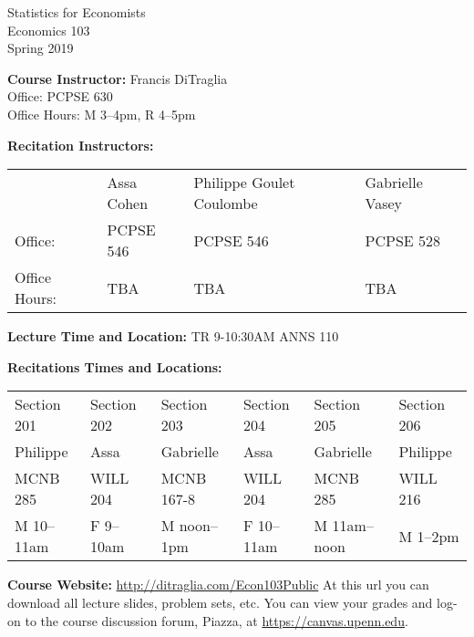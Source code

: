 \documentclass[11pt, letterpaper]{article}
\begin{document}
\thispagestyle{plain}

\begin{center}
\Large
\sc
Statistics for Economists\\
\large
Economics 103\\
\large
Spring 2019
\end{center}



\normalsize

\noindent \textbf{Course Instructor:} Francis DiTraglia \\
Office: PCPSE 630\\
Office Hours: M 3--4pm, R 4--5pm

\medskip


\noindent \textbf{Recitation Instructors:}

\medskip
\noindent

\begin{tabular}{llll}
  & Assa Cohen & Philippe Goulet Coulombe & Gabrielle Vasey\\
Office:& PCPSE 546 & PCPSE 546 & PCPSE 528 \\ 
Office Hours:& TBA & TBA & TBA  
\end{tabular}

\medskip
 
\noindent \textbf{Lecture Time and Location:} TR 9-10:30AM ANNS 110 

\medskip

\noindent \textbf{Recitations Times and Locations:}
\medskip \noindent

\begin{tabular}{llllll}
	Section 201 & Section 202 & Section 203 & Section 204 & Section 205 & Section 206\\ 
  Philippe & Assa & Gabrielle & Assa & Gabrielle & Philippe \\
	MCNB 285 & WILL 204 & MCNB 167-8 & WILL 204 & MCNB 285 & WILL 216 \\ 
  M 10--11am & F 9--10am & M noon--1pm & F 10--11am & M 11am--noon & M 1--2pm
\end{tabular}


\medskip

\medskip
 
\noindent \textbf{Course Website:} \url{http://ditraglia.com/Econ103Public} At this url you can download all lecture slides, problem sets, etc.
You can view your grades and log-on to the course discussion forum, Piazza, at \url{https://canvas.upenn.edu}.

\medskip
\end{document}
